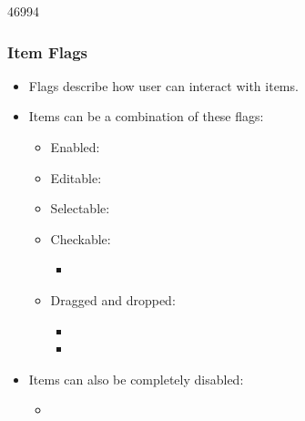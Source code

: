 \begin{slide}{46994}\frametitle{Item Flags}

\begin{itemize}
\item Flags describe how user can interact with items.
\item Items can be a combination of these flags:
  \begin{itemize}
  \item Enabled:  
  \item Editable:  
  \item Selectable:  
  \item Checkable:  
    \begin{itemize}
    \item {} 
    \end{itemize}
  \item Dragged and dropped:
    \begin{itemize}
    \item {} 
    \item {} 
    \end{itemize}
  \end{itemize}
\item Items can also be completely disabled:
  \begin{itemize}
  \item {} 
  \end{itemize}
\end{itemize}

\end{slide}

